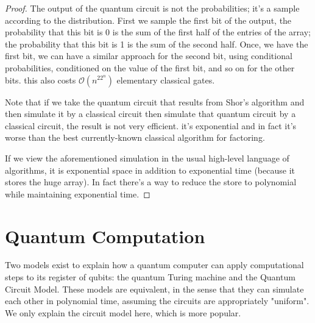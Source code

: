 \documentclass[12pt, oneside]{book}
\theoremstyle{definition}
\theoremstyle{definition}
\theoremstyle{remark}
\begin{document}
\begin{proof}
    The output of the quantum circuit is not the probabilities; it's a sample according to the distribution. First we sample the first bit of the output, the probability that this bit is 0 is the sum of the first half of the entries of the array; the probability that this bit is 1 is the sum of the second half. Once, we have the first bit, we can have a similar approach for the second bit, using conditional probabilities, conditioned on the value of the first bit, and so on for the other bits. this also costs $\mathcal{O}(n^22^n)$ elementary classical gates.

    Note that if we take the quantum circuit that results from Shor's algorithm and then simulate it by a classical circuit then simulate that quantum circuit by a classical circuit, the result is not very efficient. it's exponential and in fact it's worse than the best currently-known classical algorithm for factoring.

    If we view the aforementioned simulation in the usual high-level language of algorithms, it is exponential space in addition to exponential time (because it stores the huge array). In fact there's a way to reduce the store to polynomial while maintaining exponential time.
\end{proof}


\section{Quantum Computation}
Two models exist to explain how a quantum computer can apply computational steps to its register of qubits: the quantum Turing machine and the Quantum Circuit Model. These models are equivalent, in the sense that they can simulate each other in polynomial time, assuming the circuits are appropriately "uniform". We only explain the circuit model here, which is more popular.
\end{document}
